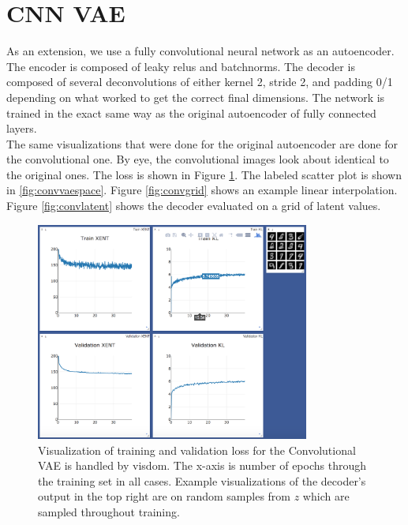 \documentclass[11pt]{article}
\begin{document}
\section{CNN VAE}
As an extension, we use a fully convolutional neural network as an autoencoder. The encoder is composed of leaky relus and batchnorms. The decoder is composed of several deconvolutions of either kernel 2, stride 2, and padding 0/1 depending on what worked to get the correct final dimensions. The network is trained in the exact same way as the original autoencoder of fully connected layers.\\
The same visualizations that were done for the original autoencoder are done for the convolutional one. By eye, the convolutional images look about identical to the original ones. The loss is shown in Figure \ref{fig:convloss}. The labeled scatter plot is shown in \ref{fig:convvaespace}. Figure \ref{fig:convgrid} shows an example linear interpolation. Figure \ref{fig:convlatent} shows the decoder evaluated on a grid of latent values.

\begin{figure}
  \centering
  \includegraphics[width=9cm]{imgs/convtrain}
  \caption{\label{fig:convloss} Visualization of training and validation loss for the Convolutional VAE is handled by visdom. The x-axis is number of epochs through the training set in all cases. Example visualizations of the decoder's output in the top right are on random samples from $z$ which are sampled throughout training.}
\end{figure}
\end{document}
